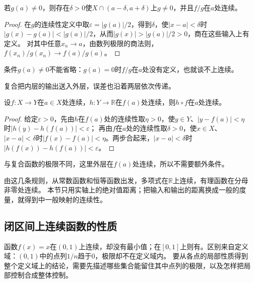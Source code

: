 \begin{theorem}[商的连续性]
\label{thm:ru-continuity-quotient}
若$g(a)\neq0$，则存在$\delta>0$使$X\cap(a-\delta,a+\delta)$上$g\neq0$，并且$f/g$在$a$处连续。
\end{theorem}
\begin{proof}
在$g$的连续性定义中取$\varepsilon=|g(a)|/2$，得到$\delta$，使$|x-a|<\delta$时$|g(x)-g(a)|<|g(a)|/2$，从而$|g(x)|>|g(a)|/2>0$，商在这些输入上有定义。
对其中任意$x_n\to a$，由数列极限的商法则，$f(x_n)/g(x_n)\to f(a)/g(a)$。
\end{proof}
条件$g(a)\neq0$不能省略：$g(a)=0$时$f/g$在$a$处没有定义，也就谈不上连续。

复合把内层的输出送入外层，误差也沿着两层依次传递。
\begin{theorem}[复合函数的连续性]
\label{thm:ru-continuity-composition}
设$f:X\to Y$在$a\in X$处连续，$h:Y\to\mathbb R$在$f(a)$处连续，则$h\circ f$在$a$处连续。
\end{theorem}
\begin{proof}
给定$\varepsilon>0$，先由$h$在$f(a)$处的连续性取$\eta>0$，使$y\in Y$、$|y-f(a)|<\eta$时$|h(y)-h(f(a))|<\varepsilon$；
再由$f$在$a$处的连续性取$\delta>0$，使$x\in X$、$|x-a|<\delta$时$|f(x)-f(a)|<\eta$。两步合起来，$|x-a|<\delta$时$|h(f(x))-h(f(a))|<\varepsilon$。
\end{proof}
与复合函数的极限不同，这里外层在$f(a)$处连续，所以不需要额外条件。

由这几条规则，从常数函数和恒等函数出发，多项式在$\mathbb R$上连续，有理函数在分母非零处连续。
本节只用实轴上的绝对值距离；把输入和输出的距离换成一般的度量，就得到中一般映射的连续性。

\subsection{闭区间上连续函数的性质}
\label{sec:ru-closed-interval-continuity}
\label{sec:analysis-metric-measurement}
\label{sec:analysis-set-metric}

函数$f(x)=x$在$(0,1)$上连续，却没有最小值；在$[0,1]$上则有。区别来自定义域：$(0,1)$中的点列$1/n$趋于$0$，极限却不在定义域内。
要从各点的局部性质得到整个定义域上的结论，需要先描述哪些集合能留住其中点列的极限，以及怎样把局部控制合成整体控制。

